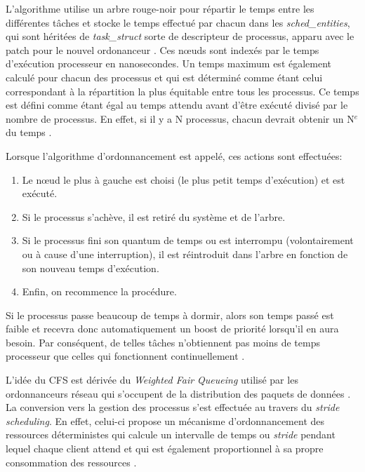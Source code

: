 \documentclass[letterpaper]{article}
\begin{document}
L'algorithme utilise un arbre rouge-noir pour répartir le temps entre les différentes tâches et stocke le temps effectué par chacun dans les \textit{sched\_entities}, qui sont héritées de \textit{task\_struct} sorte de descripteur de processus, apparu avec le patch pour le nouvel ordonanceur \citep{Pabla:2009:CFS:1594371.1594375}. Ces nœuds sont indexés par le temps d'exécution processeur en nanosecondes. Un temps maximum est également calculé pour chacun des processus et qui est déterminé comme étant celui correspondant à la répartition la plus équitable entre tous les processus. Ce temps est défini comme étant égal au temps attendu avant d'être exécuté divisé par le nombre de processus. En effet, si il y a N processus, chacun devrait obtenir un N$^{e}$ du temps \citep{IllustrationCFSusingAATree}.

Lorsque l'algorithme d'ordonnancement est appelé, ces actions sont effectuées:

\begin{enumerate}
\item Le nœud le plus à gauche est choisi (le plus petit temps d'exécution) et est exécuté.
\item Si le processus s'achève, il est retiré du système et de l'arbre.
\item Si le processus fini son quantum de temps ou est interrompu (volontairement ou à cause d'une interruption), il est réintroduit dans l'arbre en fonction de son nouveau temps d'exécution.
\item Enfin, on recommence la procédure.
\end{enumerate}

Si le processus passe beaucoup de temps à dormir, alors son temps passé est faible et recevra donc automatiquement un boost de priorité lorsqu'il en aura besoin. Par conséquent, de telles tâches n'obtiennent pas moins de temps processeur que celles qui fonctionnent continuellement \citep{Wong:2008:TAF:1400097.1400102}.

L'idée du CFS est dérivée du \textit{Weighted Fair Queueing} utilisé par les ordonnanceurs réseau qui s'occupent de la distribution des paquets de données \citep{Demers:1989:ASF:75247.75248}. La conversion vers la gestion des processus s'est effectuée au travers du \textit{stride scheduling}. En effet, celui-ci propose un mécanisme d'ordonnancement des ressources déterministes qui calcule un intervalle de temps ou \textit{stride} pendant lequel chaque client attend et qui est également proportionnel à sa propre consommation des ressources \citep{Waldspurger:1995:LSS:888601}.
\end{document}
